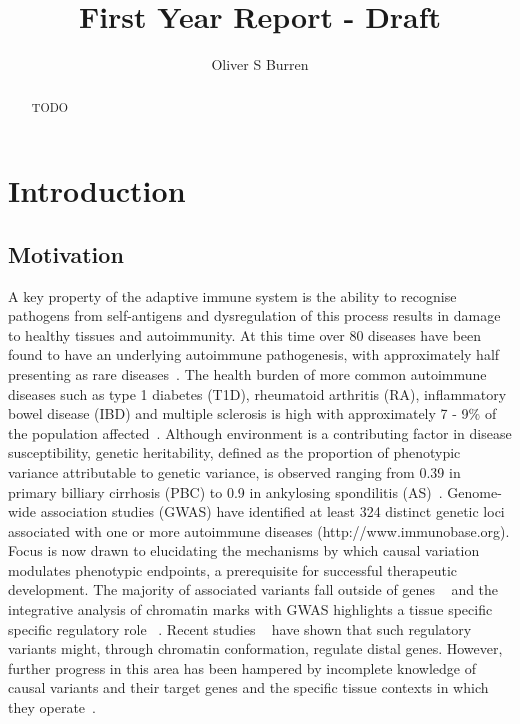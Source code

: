 \documentclass[a4paper,11pt]{report}
\author{Oliver S Burren}
\title{First Year Report - Draft}
\begin{document}
\maketitle

\begin{abstract}
   TODO
\end{abstract}
\tableofcontents
\chapter{Introduction}

\section{Motivation}

A key property of the adaptive immune system is the ability to recognise pathogens from self-antigens and dysregulation of this process results in damage to healthy tissues and autoimmunity. At this time over 80 diseases have been found to have an underlying autoimmune pathogenesis, with approximately half presenting as rare diseases~\citep{HayterCook2012}. The health burden of more common autoimmune diseases such as type 1 diabetes (T1D), rheumatoid arthritis (RA), inflammatory bowel disease (IBD) and multiple sclerosis is high with approximately 7 - 9$\%$ of the population affected~\citep{CooperBynumSomers2009}. Although environment is a contributing factor in disease susceptibility, genetic heritability, defined as the proportion of phenotypic variance attributable to genetic variance, is observed ranging from 0.39 in primary billiary cirrhosis (PBC) to 0.9 in ankylosing spondilitis (AS)~\citep{Gutierrez-ArcelusRichRaychaudhuri2016}.  Genome-wide association studies (GWAS) have identified at least 324 distinct genetic loci associated with one or more autoimmune diseases (http://www.immunobase.org). Focus is now drawn to elucidating the mechanisms by which causal variation modulates phenotypic endpoints, a prerequisite for successful therapeutic development. The majority of associated variants fall outside of genes ~\citep{MauranoHumbertRynesEtAl2012} and the integrative analysis of chromatin marks with GWAS highlights a tissue specific specific regulatory role ~\citep{FarhMarsonZhuEtAl2015}.  Recent studies ~\citep{ClaussnitzerDankelKimEtAl2015,SmemoTenaKimEtAl2014,Davison2012-zk} have shown that such regulatory variants might, through chromatin conformation, regulate distal genes. However, further progress in this area has been hampered by incomplete knowledge of causal variants and their target genes and the specific tissue contexts in which they operate~\citep{Albert2015-jn}.
\end{document}
